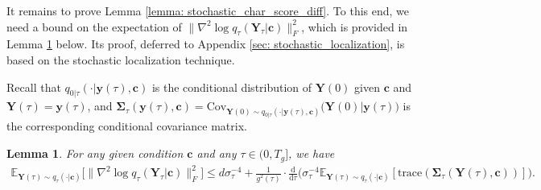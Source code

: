 \documentclass[11pt]{article}
\newtheorem{lemma}{Lemma}
\newcommand{\mE}{\mathbb{E}}
\newcommand{\bY}{\mathbf{Y}}
\newcommand{\by}{\mathbf{y}}
\newcommand{\bc}{\mathbf{c}}
\newcommand{\bSimga}{\boldsymbol{\Sigma}}
\newcommand{\cov}{{\text{Cov}}}
\newcommand{\intd}{\mathrm{d}}
\begin{document}
It remains to prove Lemma \ref{lemma: stochastic_char_score_diff}. To this end, we need a bound on the expectation of $\|\nabla^2\log q_\tau(\bY_\tau|\bc)\|_F^2$, which is provided in Lemma \ref{lemma: hessian_score_bound} below. Its proof, deferred to Appendix \ref{sec: stochastic_localization}, is based on the stochastic localization technique.

Recall that $q_{0|\tau}(\cdot | \by(\tau), \bc)$ is the conditional distribution of $\bY(0)$ given $\bc$ and $\bY(\tau)=\by(\tau)$, and $\bSimga_\tau(\by(\tau),\bc) = \cov_{\bY(0)\sim q_{0|\tau}(\cdot | \by(\tau), \bc)} \big(\bY(0) | \by(\tau)\big)$  %
    is the corresponding conditional covariance matrix.
\begin{lemma}\label{lemma: hessian_score_bound}
    For any given condition $\bc$ and any $\tau \in (0, T_g]$, we have
    \begin{align*}
        \mE_{\bY(\tau)\sim q_\tau(\cdot | \bc)}\big[\|\nabla^2\log q_\tau(\bY_\tau|\bc)\|_F^2\big]\le d\sigma_\tau^{-4} + \frac{1}{g^2(\tau)}\cdot \frac{\intd}{\intd\tau}\bigg(\sigma_\tau^{-4}\mE_{\bY(\tau)\sim q_\tau(\cdot | \bc)}[\text{trace}(\bSimga_\tau(\bY(\tau), \bc))]\bigg).
    \end{align*}
    \end{lemma}
\end{document}
